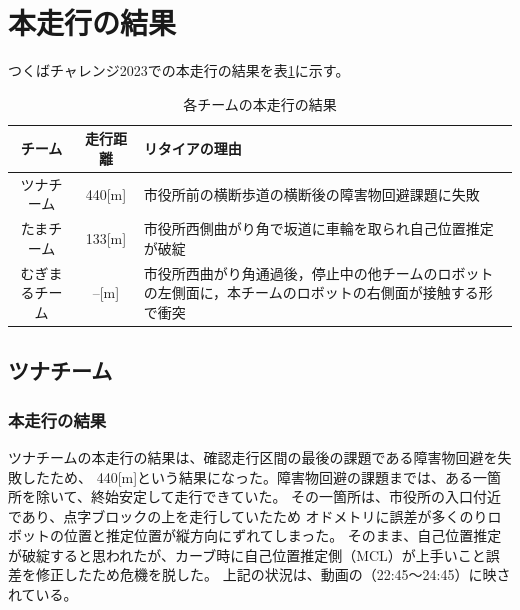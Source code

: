 \documentclass[twocolumn,9pt]{jsproceedings}
\begin{document}
\section{本走行の結果}

つくばチャレンジ2023での本走行の結果を表\ref{MainRun}に示す。

\begin{table}[H]
  \caption{各チームの本走行の結果}
  \label{MainRun}
  \begin{tabular}{|c|c|p{4.0cm}|}
    \hline
    チーム         & 走行距離 & リタイアの理由                                                                                             \\
    \hline
    ツナチーム     & 440[m]   & 市役所前の横断歩道の横断後の障害物回避課題に失敗                                                           \\
    \hline
    たまチーム     & 133[m]   & 市役所西側曲がり角で坂道に車輪を取られ自己位置推定が破綻                                                   \\
    \hline
    むぎまるチーム & --[m]    & 市役所西曲がり角通過後，停止中の他チームのロボットの左側面に，本チームのロボットの右側面が接触する形で衝突 \\
    \hline
  \end{tabular}
\end{table}



\subsection{ツナチーム}
\subsubsection{本走行の結果}
ツナチームの本走行の結果は、確認走行区間の最後の課題である障害物回避を失敗したため、
440[m]という結果になった。障害物回避の課題までは、ある一箇所を除いて、終始安定して走行できていた。
その一箇所は、市役所の入口付近であり、点字ブロックの上を走行していたため
オドメトリに誤差が多くのりロボットの位置と推定位置が縦方向にずれてしまった。
そのまま、自己位置推定が破綻すると思われたが、カーブ時に自己位置推定側（MCL）が上手いこと誤差を修正したため危機を脱した。
上記の状況は、動画\cite{ike_nav_loc_youtube}の（22:45〜24:45）に映されている。
\end{document}
